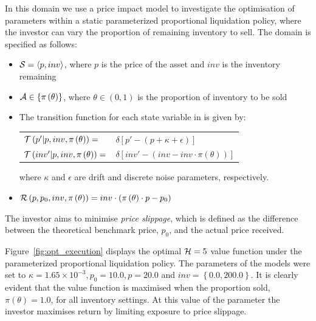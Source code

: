 In this domain we use a price impact model to investigate the optimisation of parameters within a static parameterized proportional liquidation policy, where the investor can vary the proportion of remaining inventory to sell. The domain is specified as follows:
\begin{itemize}
    \item {\footnotesize $ \mathcal{S} = \left\langle p, inv \right\rangle$}, where $ p $ is the price of the asset and $ inv $ is the inventory remaining
    \item {\footnotesize $ \mathcal{A} \in \left\lbrace \pi\left( \theta \right) \right\rbrace$}, where {\footnotesize $ \theta \in \left( 0, 1\right)$} is the proportion of inventory to be sold
    \item The transition function {\footnotesize \Transition} for each state variable in {\footnotesize \State} is given by:    \\
    {\footnotesize 
        \abovedisplayskip=5pt
        \belowdisplayskip=0pt
        \renewcommand{\arraystretch}{1.5}
        \begin{tabular}{ll}
            $\mathcal{T}\left( p' | p, inv, \pi\left( \theta \right) \right) = $ & $\delta \left[ p' - (p + \kappa + \epsilon) \right] $ \\
            $\mathcal{T}\left( inv' | p, inv, \pi\left( \theta \right) \right) = $ & $\delta \left[ inv' - (inv - inv \cdot \pi\left( \theta \right)) \right] $ \\
        \end{tabular}
    }%
    {\footnotesize where $ \kappa $ and $ \epsilon$ are drift and discrete noise parameters, respectively.}
    \item {\footnotesize $ \mathcal{R}\left(p, p_0, inv, \pi\left( \theta \right) \right) = inv \cdot \left(\pi\left( \theta \right) \cdot p - p_0\right)$ }  
\end{itemize}

The investor aims to minimise \textit{price slippage}, which is defined as the difference between the theoretical benchmark price, {\footnotesize $p_0$}, and the actual price received.

Figure~\ref{fig:opt_execution} displays the optimal {\footnotesize$ \mathcal{H} = 5 $} value function under the parameterized proportional liquidation policy. The parameters of the models were set to {\footnotesize$ \kappa = 1.65 \times 10^{-3}, p_0 = 10.0, p = 20.0$} and {\footnotesize $inv = \left\lbrace 0.0, 200.0\right\rbrace$}. It is clearly evident that the value function is maximised when the proportion sold, {\footnotesize $\pi\left( \theta \right) = 1.0$}, for all inventory settings. At this value of the parameter the investor maximises return by limiting exposure to price slippage.


